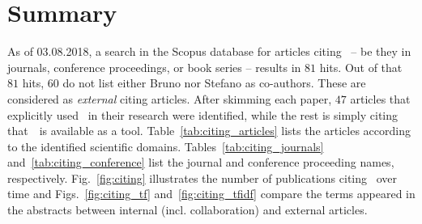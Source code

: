 \documentclass[11pt]{article}
\begin{document}
\Header
\Footer 
\FrontPage

\section*{Summary}

As of 03.08.2018, a search in the Scopus database for articles citing \uqlab~-- be they in journals, conference proceedings, or book series -- results in $81$ hits.
Out of that $81$ hits, $60$ do not list either Bruno nor Stefano as co-authors.
These are considered as \emph{external} citing articles.
After skimming each paper, $47$ articles that explicitly used \uqlab~in their research were identified, while the rest is simply citing that~\uqlab~is available as a tool.
Table~\ref{tab:citing_articles} lists the articles according to the identified scientific domains.
Tables~\ref{tab:citing_journals} and~\ref{tab:citing_conference} list the journal and conference proceeding names, respectively.
Fig.~\ref{fig:citing} illustrates the number of publications citing \uqlab~over time
and Figs.~\ref{fig:citing_tf} and~\ref{fig:citing_tfidf} compare the terms appeared in the abstracts between internal (incl. collaboration) and external articles.
\end{document}
